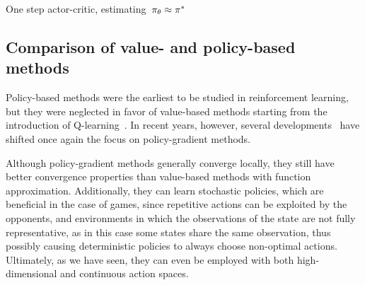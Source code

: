 \begin{algorithm}
	\caption{One step actor-critic, estimating~${\pi_{\theta}\approx\pi^{*}}$}
	\label{alg:actor_critic}

\end{algorithm}

\subsection{Comparison of value- and policy-based methods}
Policy-based methods were the earliest to be studied in reinforcement learning, but they were neglected in favor of value-based methods starting from the introduction of Q-learning~\cite{watkins1989learning}. In recent years, however, several developments~\cite{peters2008, degris2012, silver2014} have shifted once again the focus on policy-gradient methods.

Although policy-gradient methods generally converge locally, they still have better convergence properties than value-based methods with function approximation. Additionally, they can learn stochastic policies, which are beneficial in the case of games, since repetitive actions can be exploited by the opponents, and environments in which the observations of the state are not fully representative, as in this case some states share the same observation, thus possibly causing deterministic policies to always choose non-optimal actions. Ultimately, as we have seen, they can even be employed with both high-dimensional and continuous action spaces.
